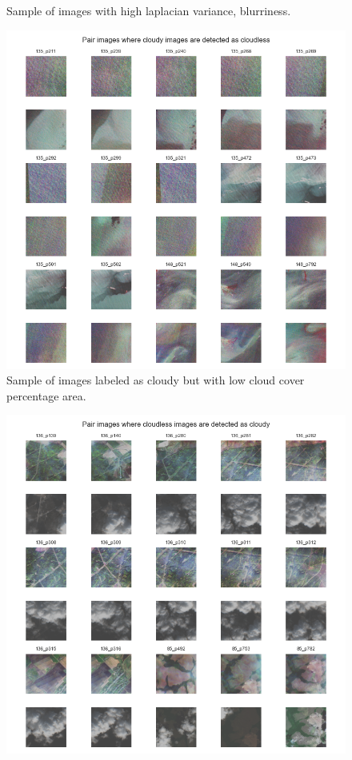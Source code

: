 \documentclass[../main.tex]{subfiles}
\begin{document}
\begin{appendices}
\begin{figure}[H]
	\caption{Sample of images with high laplacian variance, blurriness.}
	\label{fig:eda-blurriness-images}
\end{figure} 
\begin{figure}[H]
	\centering
	\includegraphics[width=16cm]{imgs/eda/cloudly-but-cloudless}
	\caption{Sample of images labeled as cloudy but with low cloud cover percentage area.}
	\label{fig:eda-low-cloud-but-cloudy}
\end{figure} 
\begin{figure}[H]
	\centering
	\includegraphics[width=16cm]{imgs/eda/cloudless-but-cloudy}

\end{figure}
\end{appendices}
\end{document}
